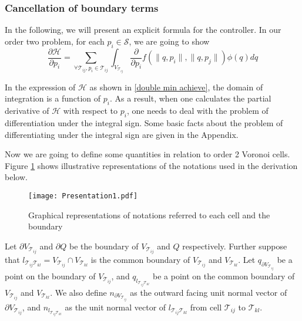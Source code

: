 \documentclass[letterpaper, 10 pt, conference]{ieeeconf}
\begin{document}
\subsubsection{Cancellation of boundary terms}
In the following, we will present an explicit formula for the controller. In our order two problem, for each $p_i\in\mathcal{S}$, we are going to show
\begin{equation}\label{pupp}
\frac{\partial \mathcal{H}}{\partial {p_i}}=\sum_{\forall \mathcal{T}_{ij},p_i\in\mathcal{T}_{ij}}
\int_{V_{\mathcal{T}_{ij}}}\frac{\partial}{\partial {p_i}}f(\|q,p_i\|,\|q,p_j\|) \phi(q) dq
\end{equation}

In the expression of $\mathcal{H}$ as shown in \eqref{double min achieve}, the domain of integration is a function of $p_i$. As a result, when one calculates the partial derivative of $\mathcal{H}$ with respect to $p_i$, one needs to deal with the problem of differentiation under the integral sign. Some basic facts about the problem of differentiating under the integral sign are given in the Appendix.

Now we are going to define some quantities in relation to order 2 Voronoi cells. Figure \ref{fig_notation} shows  illustrative representations of the notations used in the derivation below.
\begin{figure}[!ht]
\begin{center}
\texttt{[image: Presentation1.pdf]}
\end{center}
\caption{Graphical representations of notations referred to each cell and the boundary}
\label{fig_notation}
\end{figure}
Let $\partial V_{\mathcal{T}_{ij}}$ and $\partial Q$ be the boundary of $V_{\mathcal{T}_{ij}}$ and $Q$ respectively. Further suppose that $l_{\mathcal{T}_{ij}\mathcal{T}_{kl}}=V_{\mathcal{T}_{ij}}\cap V_{\mathcal{T}_{kl}}$ is the common boundary of $V_{\mathcal{T}_{ij}}$ and $V_{\mathcal{T}_{kl}}$. Let $q_{\partial V_{\mathcal{T}_{ij}}}$ be a point on the boundary of $V_{\mathcal{T}_{ij}}$, and $q_{l_{\mathcal{T}_{ij}\mathcal{T}_{kl}}}$ be a point on the common boundary of $V_{\mathcal{T}_{ij}}$ and $V_{\mathcal{T}_{kl}}$. We also define $n_{\partial V_{\mathcal{T}_{ij}}}$ as the outward facing unit normal vector of $\partial V_{\mathcal{T}_{ij}}$, and $n_{l_{\mathcal{T}_{ij}\mathcal{T}_{kl}}}$ as the unit normal vector of $l_{\mathcal{T}_{ij}\mathcal{T}_{kl}}$ from cell $\mathcal{T}_{ij}$ to $\mathcal{T}_{kl}$.
\end{document}
